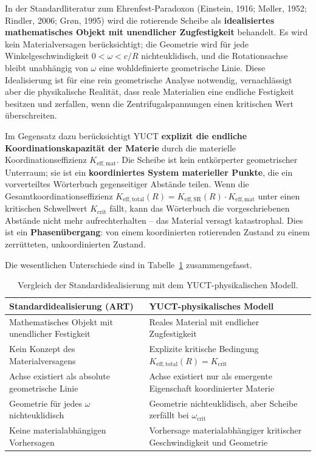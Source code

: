 \documentclass[12pt,a4paper]{article}
\newcommand{\Keffmat}{K_{\mathrm{eff,mat}}}
\newcommand{\Kefftot}{K_{\mathrm{eff,total}}}
\newcommand{\KeffSR}{K_{\mathrm{eff,SR}}}
\newcommand{\Kcrit}{K_{\mathrm{crit}}}
\begin{document}
	In der Standardliteratur zum Ehrenfest-Paradoxon (Einstein, 1916; Møller, 1952; Rindler, 2006; Grøn, 1995) wird die rotierende Scheibe als \textbf{idealisiertes mathematisches Objekt mit unendlicher Zugfestigkeit} behandelt. Es wird kein Materialversagen berücksichtigt; die Geometrie wird für jede Winkelgeschwindigkeit \(0 < \omega < c/R\) nichteuklidisch, und die Rotationsachse bleibt unabhängig von \(\omega\) eine wohldefinierte geometrische Linie. Diese Idealisierung ist für eine rein geometrische Analyse notwendig, vernachlässigt aber die physikalische Realität, dass reale Materialien eine endliche Festigkeit besitzen und zerfallen, wenn die Zentrifugalspannungen einen kritischen Wert überschreiten.
	
	Im Gegensatz dazu berücksichtigt YUCT \textbf{explizit die endliche Koordinationskapazität der Materie} durch die materielle Koordinationseffizienz \(K_{\mathrm{eff,mat}}\). Die Scheibe ist kein entkörperter geometrischer Unterraum; sie ist ein \textbf{koordiniertes System materieller Punkte}, die ein vorverteiltes Wörterbuch gegenseitiger Abstände teilen. Wenn die Gesamtkoordinationseffizienz \(\Kefftot(R) = \KeffSR(R) \cdot \Keffmat\) unter einen kritischen Schwellwert \(\Kcrit\) fällt, kann das Wörterbuch die vorgeschriebenen Abstände nicht mehr aufrechterhalten – das Material versagt katastrophal. Dies ist ein \textbf{Phasenübergang}: von einem koordinierten rotierenden Zustand zu einem zerrütteten, unkoordinierten Zustand.
	
	Die wesentlichen Unterschiede sind in Tabelle~\ref{tab:idealization} zusammengefasst.
	
	\begin{table}[h]
		\centering
		\caption{Vergleich der Standardidealisierung mit dem YUCT-physikalischen Modell.}
		\label{tab:idealization}
		\begin{tabular}{p{5cm}p{5cm}}
			\toprule
			\textbf{Standardidealisierung (ART)} & \textbf{YUCT-physikalisches Modell} \\
			\midrule
			Mathematisches Objekt mit unendlicher Festigkeit & Reales Material mit endlicher Zugfestigkeit \\
			Kein Konzept des Materialversagens & Explizite kritische Bedingung \(\Kefftot(R) = \Kcrit\) \\
			Achse existiert als absolute geometrische Linie & Achse existiert nur als emergente Eigenschaft koordinierter Materie \\
			Geometrie für jedes \(\omega\) nichteuklidisch & Geometrie nichteuklidisch, aber Scheibe zerfällt bei \(\omega_{\text{crit}}\) \\
			Keine materialabhängigen Vorhersagen & Vorhersage materialabhängiger kritischer Geschwindigkeit und Geometrie \\
			\bottomrule
		\end{tabular}
	\end{table}
	
\end{document}

